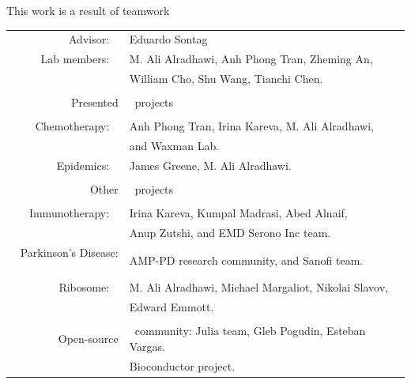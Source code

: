 \documentclass[10pt]{beamer}
\begin{document}
\begin{frame}{This work is a result of teamwork}
	\small \hspace{1cm}
	{\begin{tabular}{r@{}l}
			Advisor:   \  & Eduardo Sontag \\ 
			Lab members:   \  & M. Ali Alradhawi, Anh Phong Tran, Zheming An, \\ 
			&  William Cho, Shu Wang, Tianchi Chen. \\ \\
			Presented & \, projects  \\ \\
			Chemotherapy: \  & Anh Phong Tran, Irina Kareva, M. Ali Alradhawi, \\ 
			& and Waxman Lab.\\
			Epidemics: \ & James Greene, M. Ali Alradhawi. \\ \\
			Other & \, projects  \\ \\
			\scriptsize Immunotherapy: \ & Irina Kareva, Kumpal Madrasi, Abed Alnaif, \\ & Anup Zutshi, and EMD Serono Inc team. \\ 
			\scriptsize Parkinson's Disease: \ & AMP-PD research community, and Sanofi team.  \\ 
			Ribosome: \ & M. Ali Alradhawi, Michael Margaliot, Nikolai Slavov, \\ & Edward Emmott. \\ \\
			Open-source & \, community: Julia team, Gleb Pogudin, Esteban Vargas.  \\
			& Bioconductor project.  \\
		\end{tabular}
	}
\end{frame}
\end{document}
